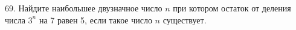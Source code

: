 69. Найдите наибольшее двузначное число $n$ при котором остаток от деления числа $3^n$ на 7 равен 5, если такое число $n$ существует.\\
